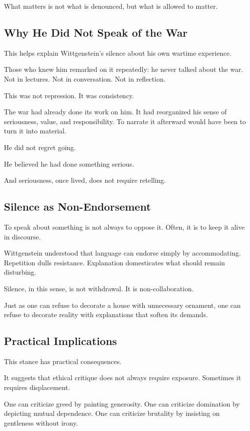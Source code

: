 \documentclass[11pt]{article}
\begin{document}
What matters is not what is denounced, but what is allowed to matter.

\subsection*{Why He Did Not Speak of the War}

This helps explain Wittgenstein’s silence about his own wartime experience.

Those who knew him remarked on it repeatedly: he never talked about the war. Not in lectures. Not in conversation. Not in reflection.

This was not repression. It was consistency.

The war had already done its work on him. It had reorganized his sense of seriousness, value, and responsibility. To narrate it afterward would have been to turn it into material.

He did not regret going.

He believed he had done something serious.

And seriousness, once lived, does not require retelling.

\subsection*{Silence as Non-Endorsement}

To speak about something is not always to oppose it. Often, it is to keep it alive in discourse.

Wittgenstein understood that language can endorse simply by accommodating. Repetition dulls resistance. Explanation domesticates what should remain disturbing.

Silence, in this sense, is not withdrawal. It is non-collaboration.

Just as one can refuse to decorate a house with unnecessary ornament, one can refuse to decorate reality with explanations that soften its demands.

\subsection*{Practical Implications}

This stance has practical consequences.

It suggests that ethical critique does not always require exposure. Sometimes it requires displacement.

One can criticize greed by painting generosity.  
One can criticize domination by depicting mutual dependence.  
One can criticize brutality by insisting on gentleness without irony.
\end{document}
